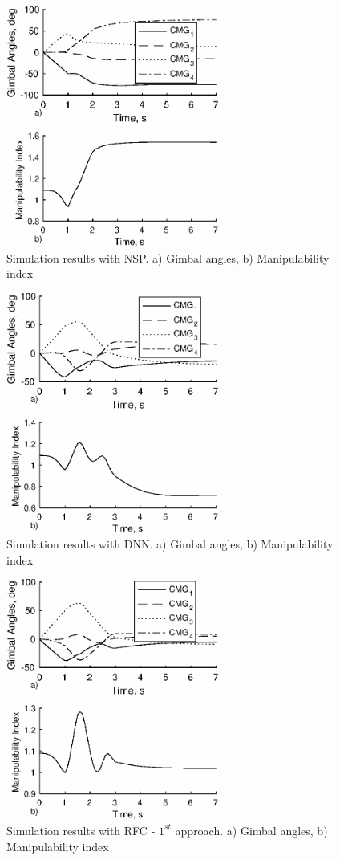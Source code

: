 \documentclass[aerospace,article,submit,moreauthors,dvi2pdf]{Definitions/mdpi}
\begin{document}
\begin{figure}[H]
\includegraphics[width=7cm]{chara6.eps}
\caption{\label{fig:predNSP}Simulation results with NSP. a) Gimbal angles, b) Manipulability index}
\end{figure}
\begin{figure}[H]
\includegraphics[width=7cm]{chara7.eps}
\caption{\label{fig:predDNN}Simulation results with DNN. a) Gimbal angles, b) Manipulability index}
\end{figure}
\begin{figure}[H]
\includegraphics[width=7cm]{chara8.eps}
\caption{\label{fig:predRFC1}Simulation results with RFC - $1^{st}$ approach. a) Gimbal angles, b) Manipulability index}
\end{figure}
\end{document}
